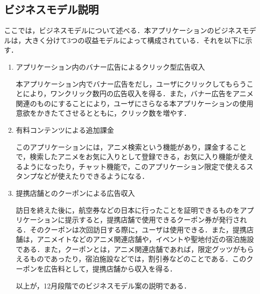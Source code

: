 \subsection{ビジネスモデル説明}
\par
 ここでは，ビジネスモデルについて述べる．本アプリケーションのビジネスモデルは，大きく分けて3つの収益モデルによって構成されている．それを以下に示す．
\begin{enumerate}
\item アプリケーション内のバナー広告によるクリック型広告収入
\par 
本アプリケーション内でバナー広告をだし，ユーザにクリックしてもらうことにより，ワンクリック数円の広告収入を得る．また，バナー広告をアニメ関連のものにすることにより，ユーザにさらなる本アプリケーションの使用意欲をかきたてさせるとともに，クリック数を増やす．
\item 有料コンテンツによる追加課金 
\par
 このアプリケーションには，アニメ検索という機能があり，課金することで，検索したアニメをお気に入りとして登録できる，お気に入り機能が使えるようになったり，チャット機能で，このアプリケーション限定で使えるスタンプなどが使えたりできるようになる．
\item 提携店舗とのクーポンによる広告収入
\par
 訪日を終えた後に，航空券などの日本に行ったことを証明できるものをアプリケーションに提示すると，提携店舗で使用できるクーポン券が発行される．そのクーポンは次回訪日する際に，ユーザは使用できる．また，提携店舗は，アニメイトなどのアニメ関連店舗や，イベントや聖地付近の宿泊施設である．また，クーポンとは，アニメ関連店舗であれば，限定グッツがもらえるものであったり，宿泊施設などでは，割引券などのことである．このクーポンを広告料として，提携店舗から収入を得る．
\par
以上が，12月段階でのビジネスモデル案の説明である．
\end{enumerate}
